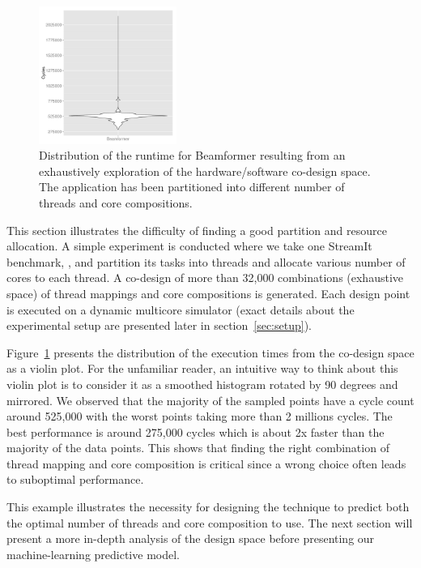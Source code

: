 \begin{figure}[t]
    \centering
    \includegraphics[width=0.4\textwidth]{graphics/beamformer_motivation.pdf}
    \caption{Distribution of the runtime for Beamformer resulting from an exhaustively exploration of the hardware/software co-design space.
     The application has been partitioned into different number of threads and core compositions.}
     \label{fig:beamformermotiv}
\vspace{-5mm}
\end{figure}

This section illustrates the difficulty of finding a good partition and resource allocation.
A simple experiment is conducted where we take one StreamIt benchmark, , and partition its tasks into threads and allocate various number of cores to each thread.
A co-design of more than 32,000 combinations (exhaustive space) of thread mappings and core compositions is generated.
Each design point is executed on a dynamic multicore simulator (exact details about the experimental setup are presented later in section~\ref{sec:setup}).

Figure~\ref{fig:beamformermotiv} presents the distribution of the execution times from the co-design space as a violin plot.
For the unfamiliar reader, an intuitive way to think about this violin plot is to consider it as a smoothed histogram rotated by 90 degrees and mirrored.
We observed that the majority of the sampled points have a cycle count around 525,000 with the worst points taking more than 2 millions cycles.
The best performance is around 275,000 cycles which is about 2x faster than the majority of the data points.
This shows that finding the right combination of thread mapping and core composition is critical since a wrong choice often leads to suboptimal performance.

This example illustrates the necessity for designing the technique to predict both the optimal number of threads and core composition to use.
The next section will present a more in-depth analysis of the design space before presenting our machine-learning predictive model.

